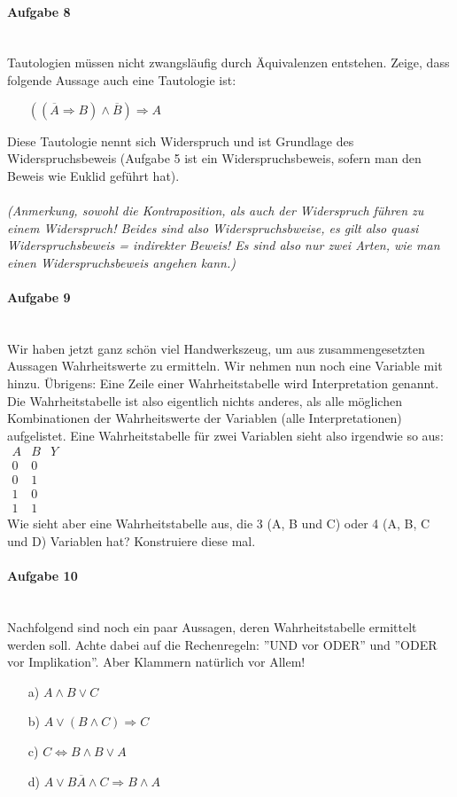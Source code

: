\documentclass[12pt,a4paper,ngerman]{scrartcl}
\begin{document}
	\paragraph{Aufgabe 8}\mbox{}\\
	Tautologien müssen nicht zwangsläufig durch Äquivalenzen entstehen. Zeige, dass folgende Aussage auch eine Tautologie ist:
	\begin{itemize}
		\item[] $((\overline{A} \Rightarrow B) \wedge \overline{B}) \Rightarrow A$
	\end{itemize}
	Diese Tautologie nennt sich Widerspruch und ist Grundlage des Widerspruchsbeweis (Aufgabe 5 ist ein Widerspruchsbeweis, sofern man den Beweis wie Euklid geführt hat).
	\\\\
	\emph{(Anmerkung, sowohl die Kontraposition, als auch der Widerspruch führen zu einem Widerspruch! Beides sind also Widerspruchsbweise, es gilt also quasi Widerspruchsbeweis = indirekter Beweis! Es sind also nur zwei Arten, wie man einen Widerspruchsbeweis angehen kann.)}
	
	\paragraph{Aufgabe 9}\mbox{}\\
	Wir haben jetzt ganz schön viel Handwerkszeug, um aus zusammengesetzten Aussagen Wahrheitswerte zu ermitteln. Wir nehmen nun noch eine Variable mit hinzu. Übrigens: Eine Zeile einer Wahrheitstabelle wird Interpretation genannt. Die Wahrheitstabelle ist also eigentlich nichts anderes, als alle möglichen Kombinationen der Wahrheitswerte der Variablen (alle Interpretationen) aufgelistet. Eine Wahrheitstabelle für zwei Variablen sieht also irgendwie so aus:\\
	$\begin{array}{cc|c}
	A & B & Y\\
	\hline
	0 & 0 & \mbox{ }\\
	0 & 1 & \mbox{ }\\
	1 & 0 & \mbox{ }\\
	1 & 1 & \mbox{ }
	\end{array}$\\
	Wie sieht aber eine Wahrheitstabelle aus, die 3 (A, B und C) oder 4 (A, B, C und D) Variablen hat? Konstruiere diese mal.
	
	\paragraph{Aufgabe 10}\mbox{}\\
	Nachfolgend sind noch ein paar Aussagen, deren Wahrheitstabelle ermittelt werden soll. Achte dabei auf die Rechenregeln: ''UND vor ODER'' und ''ODER vor Implikation''. Aber Klammern natürlich vor Allem!
	\begin{itemize}
		\item[a)] $A \wedge B \vee C$
		\item[b)] $A \vee (B \wedge C) \Rightarrow C$
		\item[c)] $C \Leftrightarrow B \wedge B \vee A$
		\item[d)] $A \vee B \overline{A} \wedge C \Rightarrow B \wedge A$
	\end{itemize}
	
\end{document}
